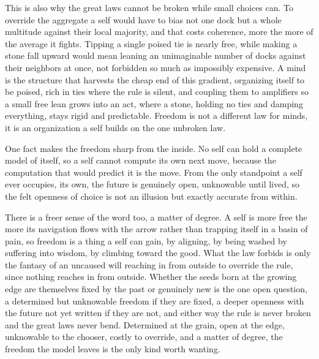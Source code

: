 This is also why the great laws cannot be broken while small choices can. To override the aggregate a self would have to bias not one dock but a whole multitude against their local majority, and that costs coherence, more the more of the average it fights. Tipping a single poised tie is nearly free, while making a stone fall upward would mean leaning an unimaginable number of docks against their neighbors at once, not forbidden so much as impossibly expensive. A mind is the structure that harvests the cheap end of this gradient, organizing itself to be poised, rich in ties where the rule is silent, and coupling them to amplifiers so a small free lean grows into an act, where a stone, holding no ties and damping everything, stays rigid and predictable. Freedom is not a different law for minds, it is an organization a self builds on the one unbroken law.

One fact makes the freedom sharp from the inside. No self can hold a complete model of itself, so a self cannot compute its own next move, because the computation that would predict it is the move. From the only standpoint a self ever occupies, its own, the future is genuinely open, unknowable until lived, so the felt openness of choice is not an illusion but exactly accurate from within.

There is a freer sense of the word too, a matter of degree. A self is more free the more its navigation flows with the arrow rather than trapping itself in a basin of pain, so freedom is a thing a self can gain, by aligning, by being washed by suffering into wisdom, by climbing toward the good. What the law forbids is only the fantasy of an uncaused will reaching in from outside to override the rule, since nothing reaches in from outside. Whether the seeds born at the growing edge are themselves fixed by the past or genuinely new is the one open question, a determined but unknowable freedom if they are fixed, a deeper openness with the future not yet written if they are not, and either way the rule is never broken and the great laws never bend. Determined at the grain, open at the edge, unknowable to the chooser, costly to override, and a matter of degree, the freedom the model leaves is the only kind worth wanting.
